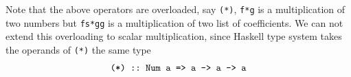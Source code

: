 \documentclass[11pt]{book}
\begin{document}
%
%
%
%
%
%
%
%
%
%
%
%
%
Note that the above operators are overloaded, say \texttt{(*)}, \texttt{f*g} is a multiplication of two numbers but \texttt{fs*gg} is a multiplication of two list of coefficients.
We can not extend this overloading to scalar multiplication, since Haskell type system takes the operands of \texttt{(*)} the same type
\begin{eqnarray}
\verb+(*) :: Num a => a -> a -> a+
\end{eqnarray}
\end{document}
